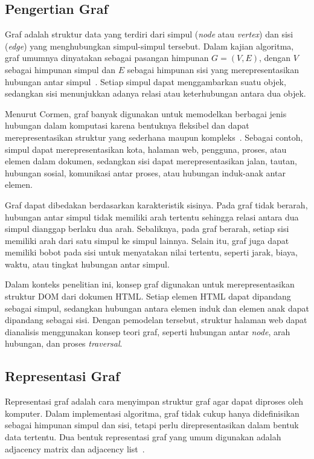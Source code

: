 \subsection{Pengertian Graf}
Graf adalah struktur data yang terdiri dari simpul ({\it node} atau {\it vertex}) dan sisi ({\it edge}) yang menghubungkan simpul-simpul tersebut. Dalam kajian algoritma, graf umumnya dinyatakan sebagai pasangan himpunan $G=(V,E)$, dengan $V$ sebagai himpunan simpul dan $E$ sebagai himpunan sisi yang merepresentasikan hubungan antar simpul~\cite{cormen:22:introalgo}. Setiap simpul dapat menggambarkan suatu objek, sedangkan sisi menunjukkan adanya relasi atau keterhubungan antara dua objek.

Menurut Cormen, graf banyak digunakan untuk memodelkan berbagai jenis hubungan dalam komputasi karena bentuknya fleksibel dan dapat merepresentasikan struktur yang sederhana maupun kompleks~\cite{cormen:22:introalgo}. Sebagai contoh, simpul dapat merepresentasikan kota, halaman web, pengguna, proses, atau elemen dalam dokumen, sedangkan sisi dapat merepresentasikan jalan, tautan, hubungan sosial, komunikasi antar proses, atau hubungan induk-anak antar elemen.

Graf dapat dibedakan berdasarkan karakteristik sisinya. Pada graf tidak berarah, hubungan antar simpul tidak memiliki arah tertentu sehingga relasi antara dua simpul dianggap berlaku dua arah. Sebaliknya, pada graf berarah, setiap sisi memiliki arah dari satu simpul ke simpul lainnya. Selain itu, graf juga dapat memiliki bobot pada sisi untuk menyatakan nilai tertentu, seperti jarak, biaya, waktu, atau tingkat hubungan antar simpul.

Dalam konteks penelitian ini, konsep graf digunakan untuk merepresentasikan struktur DOM dari dokumen HTML. Setiap elemen HTML dapat dipandang sebagai simpul, sedangkan hubungan antara elemen induk dan elemen anak dapat dipandang sebagai sisi. Dengan pemodelan tersebut, struktur halaman web dapat dianalisis menggunakan konsep teori graf, seperti hubungan antar \textit{node}, arah hubungan, dan proses \textit{traversal}.

\subsection{Representasi Graf}
Representasi graf adalah cara menyimpan struktur graf agar dapat diproses oleh komputer. Dalam implementasi algoritma, graf tidak cukup hanya didefinisikan sebagai himpunan simpul dan sisi, tetapi perlu direpresentasikan dalam bentuk data tertentu. Dua bentuk representasi graf yang umum digunakan adalah adjacency matrix dan adjacency list~\cite{cormen:22:introalgo}.

